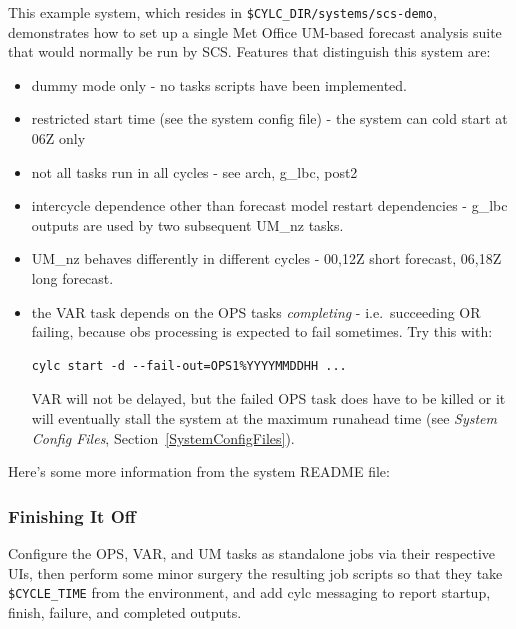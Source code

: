 \documentclass[11pt,a4paper]{article}
\begin{document}
This example system, which resides in 
\lstinline=$CYLC_DIR/systems/scs-demo=,
demonstrates how to set up a single Met Office
UM-based forecast analysis suite that would normally be run by SCS.
Features that distinguish this system are:

\begin{itemize}

    \item dummy mode only - no tasks scripts have been implemented.

    \item restricted start time (see the system config file) - the
        system can cold start at 06Z only

    \item not all tasks run in all cycles - see arch, g\_lbc, post2

    \item intercycle dependence other than forecast model restart 
        dependencies - g\_lbc outputs are used by two subsequent UM\_nz
        tasks.

    \item UM\_nz behaves differently in different cycles - 00,12Z short
        forecast, 06,18Z long forecast.

    \item the VAR task depends on the OPS tasks {\em completing} - i.e.\
        succeeding OR failing, because obs processing is expected to
        fail sometimes.  Try this with:

        \begin{lstlisting}
cylc start -d --fail-out=OPS1%YYYYMMDDHH ...
        \end{lstlisting}

        VAR will not be delayed, but the failed OPS task does have to be
        killed or it will eventually stall the system at the maximum
        runahead time (see {\em System Config Files},
        Section~\ref{SystemConfigFiles}).
        
\end{itemize}

Here's some more information from the system README file:

\lstset{language=}


\subsubsection{Finishing It Off}

Configure the OPS, VAR, and UM tasks as standalone jobs via their
respective UIs, then perform some minor surgery the resulting
job scripts so that they take \lstinline=$CYCLE_TIME= from the
environment, and add cylc messaging to report startup, finish, failure,
and completed outputs.
\end{document}
